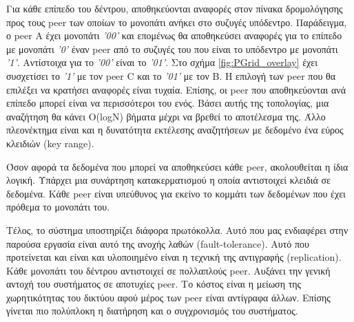 Για κάθε επίπεδο του δέντρου, αποθηκεύονται αναφορές στον πίνακα 
δρομολόγησης προς τους peer των οποίων το μονοπάτι ανήκει στο συζυγές 
υπόδεντρο. Παράδειγμα, ο peer Α έχει μονοπάτι \textit{'00'} και επομένως θα 
αποθηκεύσει αναφορές για το επίπεδο με μονοπάτι \textit{'0'} έναν peer από το 
συζυγές του που είναι το υπόδεντρο με μονοπάτι \textit{'1'}. Αντίστοιχα για το 
\textit{'00'} είναι το \textit{'01'}. Στο σχήμα \ref{fig:PGrid_overlay} έχει 
συσχετίσει το \textit{'1'} με τον peer C και το \textit{'01'} με τον B. 
Η επιλογή των peer που θα επιλέξει να κρατήσει αναφορές είναι τυχαία. Επίσης, 
οι peer που αποθηκεύονται ανά επίπεδο μπορεί είναι να περισσότεροι του ενός. 
Βάσει αυτής της τοπολογίας, μια αναζήτηση θα κάνει Ο(logN) βήματα μέχρι να 
βρεθεί το αποτέλεσμα της. Άλλο πλεονέκτημα είναι και η δυνατότητα εκτέλεσης 
αναζητήσεων με δεδομένο ένα εύρος κλειδιών (key range).

Όσον αφορά τα δεδομένα που μπορεί να αποθηκεύσει κάθε peer, 
ακολουθείται η ίδια λογική. Υπάρχει μια συνάρτηση κατακερματισμού η 
οποία αντιστοιχεί κλειδιά σε δεδομένα. Κάθε peer είναι υπεύθυνος για 
εκείνο το κομμάτι των δεδομένων που έχει πρόθεμα το μονοπάτι του.

Τέλος, το σύστημα υποστηρίζει διάφορα πρωτόκολλα. Αυτό που μας 
ενδιαφέρει στην παρούσα εργασία είναι αυτό της ανοχής λαθών 
(fault-tolerance). Αυτό που προτείνεται και είναι και υλοποιημένο είναι 
η τεχνική της αντιγραφής (replication). Κάθε μονοπάτι του δέντρου 
αντιστοιχεί σε πολλαπλούς peer. Αυξάνει την γενική αντοχή του συστήματος 
σε αποτυχίες peer. Το κόστος είναι η μείωση της χωρητικότητας του 
δικτύου αφού μέρος των peer είναι αντίγραφα άλλων. Επίσης γίνεται πιο 
πολύπλοκη η διατήρηση και ο συγχρονισμός του συστήματος. 
